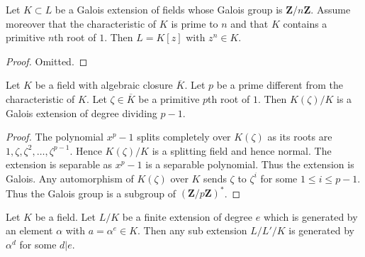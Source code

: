 \begin{lemma}
\label{lemma-Kummer}
Let $K \subset L$ be a Galois extension of fields whose Galois group is
$\mathbf{Z}/n\mathbf{Z}$. Assume moreover that the characteristic of $K$
is prime to $n$ and that $K$ contains a primitive $n$th root of $1$.
Then $L = K[z]$ with $z^n \in K$.
\end{lemma}

\begin{proof}
Omitted.
\end{proof}

\begin{lemma}
\label{lemma-adjoint-pth-root-unity}
Let $K$ be a field with algebraic closure $\overline{K}$.
Let $p$ be a prime different from the characteristic of $K$.
Let $\zeta \in \overline{K}$ be a primitive $p$th root
of $1$. Then $K(\zeta)/K$ is a Galois extension of degree dividing $p - 1$.
\end{lemma}

\begin{proof}
The polynomial $x^p - 1$ splits completely over
$K(\zeta)$ as its roots are $1, \zeta, \zeta^2, \ldots, \zeta^{p - 1}$.
Hence $K(\zeta)/K$ is a splitting field and hence normal.
The extension is separable as $x^p - 1$ is a separable polynomial.
Thus the extension is Galois. Any automorphism of $K(\zeta)$ over $K$
sends $\zeta$ to $\zeta^i$ for some $1 \leq i \leq p - 1$.
Thus the Galois group is a subgroup of $(\mathbf{Z}/p\mathbf{Z})^*$.
\end{proof}

\begin{lemma}
\label{lemma-subfields-kummer}
Let $K$ be a field. Let $L/K$ be a finite extension of degree $e$
which is generated by an element $\alpha$ with $a = \alpha^e \in K$.
Then any sub extension $L/L'/K$ is generated by $\alpha^d$ for some $d | e$.
\end{lemma}

